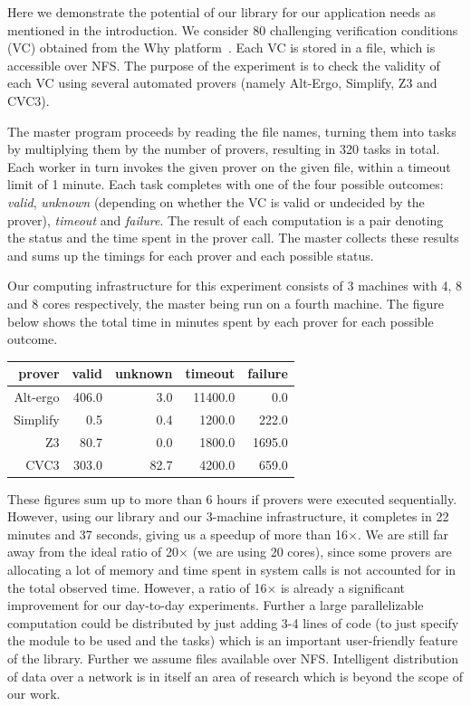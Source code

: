 \documentclass{llncs}
\begin{document}
Here we demonstrate the potential of our library for our application
needs as mentioned in the introduction. 
We consider 80 challenging verification conditions
(VC) obtained from the Why platform~\cite{filliatre07cav}.  Each
VC is stored in a file, which is accessible over
NFS. The purpose of the experiment is to check the validity of each VC
using several automated provers (namely Alt-Ergo, Simplify, Z3 and CVC3).

The master program proceeds by reading the file names, turning them
into tasks by multiplying them by the number of provers, resulting in
320 tasks in total.
Each worker in turn invokes the given prover on the given file, within
a timeout limit of 1 minute.
Each task completes with one of the four possible outcomes: \emph{valid},
\emph{unknown} (depending on
whether the VC is valid or undecided by the prover), 
\emph{timeout} and \emph{failure}.
The result of each computation is a pair denoting the status and the
time spent in the prover call. The master collects these results and
sums up the timings for each prover and each possible status.

Our computing
infrastructure for this experiment consists of 3 machines with 4, 8 and 8 cores
respectively, the master being run on a fourth machine. 
The figure below shows the total time in minutes spent by each prover
for each possible outcome.
\begin{center}
  \begin{tabular}{|r||r|r|r|r|}
    \hline
    prover   & valid & unknown & timeout & failure
    \\\hline\hline
    Alt-ergo & 406.0 & 3.0   &  11400.0 & 0.0       
    \\\hline
    Simplify &  0.5   & 0.4   &  1200.0 & 222.0   
    \\\hline
    Z3       & 80.7   & 0.0   &  1800.0 & 1695.0   
    \\\hline
    CVC3     & 303.0  & 82.7  &  4200.0 & 659.0   
    \\\hline
  \end{tabular}
\end{center}

These figures sum up to more than 6 hours if provers were executed
sequentially. However, using our library and our 3-machine
infrastructure, it completes in 22 minutes and 37 seconds, giving us a
speedup of more than 16$\times$. We are still far away from the ideal
ratio of 20$\times$ (we are using 20 cores), since some provers are
allocating a lot of memory and time spent in system calls is not
accounted for in the total observed time. However, a ratio of
16$\times$ is already a significant improvement for our day-to-day
experiments. Further a large parallelizable computation could be
distributed by just adding 3-4 lines of code (to just specify the
module to be used and the tasks) which is an important user-friendly
feature of the library. Further we assume files available over
NFS. Intelligent distribution of data over a network is in itself an
area of research which is beyond the scope of our work.
\end{document}

